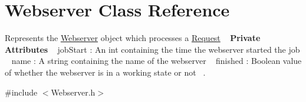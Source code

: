 \hypertarget{classWebserver}{}\section{Webserver Class Reference}
\label{classWebserver}


Represents the \hyperlink{classWebserver}{Webserver} object which processes a \hyperlink{classRequest}{Request} ~\newline
{\bfseries Private Attributes} ~\newline
job\+Start \+: An int containing the time the webserver started the job ~\newline
 name \+: A string containing the name of the webserver ~\newline
 finished \+: Boolean value of whether the webserver is in a working state or not~\newline
.  




{\ttfamily \#include $<$Webserver.\+h$>$}

